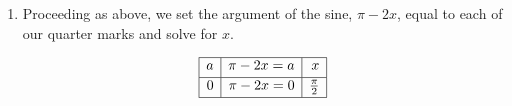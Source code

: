 \begin{ex}
\begin{enumerate}
\hspace{.5in} \begin{tabular}{m{2.7in}m{3in}}
\setlength{\extrarowheight}{2pt}
\setlength{\extrarowheight}{2pt}
\[ \begin{array}{|r||r|r|}  

\hline

 x & f(x) & (x,f(x)) \\ [2pt] \hline
1  & 4 & (1,4) \\ [2pt]   \hline

2  & 1 & (2,1) \\ [2pt] \hline 

3 & -2 & (3,-2) \\ [2pt] \hline 

4  & 1 & (4,1) \\ [2pt] \hline 

5 & 4 & (5,4) \\  [2pt] \hline
\end{array} \]
\setlength{\extrarowheight}{0pt} &

\begin{mfpic}[15]{-1}{6}{-3}{5}
\axes
\tlabel[cc](6,-0.25){\scriptsize $x$}
\tlabel[cc](0.25,5){\scriptsize $y$}
\tlpointsep{4pt}
\end{mfpic} \\

\end{tabular}

One cycle is graphed on $[1,5]$ so the period is the length of that interval which is $4$.

\item  Proceeding as above, we set the argument of the sine, $\pi - 2x$, equal to each of our quarter marks and solve for $x$.

\setlength{\extrarowheight}{2pt}
\[ \begin{array}{|r|r|r|}  

\hline

 a & \pi - 2x = a & x \\ [2pt] \hline
0  & \pi - 2x = 0 & \frac{\pi}{2} \\ [2pt]   \hline


\end{array}\]
\end{enumerate}
\end{ex}

